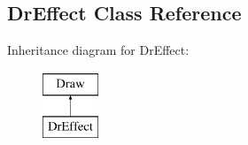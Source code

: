 \hypertarget{classDrEffect}{\subsection{\-Dr\-Effect \-Class \-Reference}
\label{classDrEffect}
}
\-Inheritance diagram for \-Dr\-Effect\-:\begin{figure}[H]
\begin{center}
\leavevmode
\includegraphics[height=2.000000cm]{classDrEffect}
\end{center}
\end{figure}
